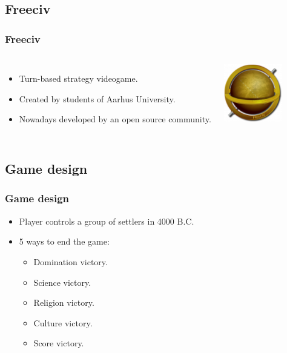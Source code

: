\subsection{Freeciv}
\begin{frame}
	\frametitle{Freeciv}

	\begin{columns}
		
		\begin{itemize}
			\item<1-> Turn-based strategy videogame.
			\item<2-> Created by students of Aarhus University.
			\item<3-> Nowadays developed by an open source community.
		\end{itemize}
		
		\centering
		\includegraphics[width=0.8\textwidth]{images/freeciv.png}
	\end{columns}
\end{frame}

\subsection{Game design}
\begin{frame}
	\frametitle{Game design}
	\begin{itemize}
		\item<1-> Player controls a group of settlers in 4000 B.C.
		\item<2-> 5 ways to end the game:
		\begin{itemize}
			\item<3-> Domination victory.
			\item<3-> Science victory.
			\item<3-> Religion victory.
			\item<3-> Culture victory.
			\item<3-> Score victory.
		\end{itemize}
	\end{itemize}
\end{frame}

